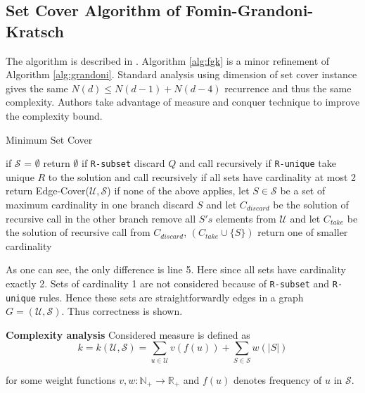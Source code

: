 \subsection{Set Cover Algorithm of Fomin-Grandoni-Kratsch}
The algorithm is described in \cite{10.1145/1552285.1552286}. Algorithm \ref{alg:fgk} is a minor refinement of Algorithm \ref{alg:grandoni}. Standard analysis using dimension of set cover instance gives the same $N(d) \leq N(d -1) + N(d - 4)$ recurrence and thus the same complexity. Authors take advantage of measure and conquer technique to improve the complexity bound.
\begin{algorithm}
\caption{Minimum Set Cover}
\label{alg:fgk}
\begin{algorithmic}[1]
\State if $\mathcal{S}$ = $\emptyset$ return $\emptyset$ 
\State if \texttt{R-subset} discard $Q$ and call recursively
\State if \texttt{R-unique} take unique $R$ to the solution and call recursively
\State if all sets have cardinality at most 2 return Edge-Cover($\mathcal{U}, \mathcal{S}$)
\State if none of the above applies, let $S \in \mathcal{S}$ be a set of maximum cardinality
\State in one branch discard $S$ and let $C_{discard}$ be the solution of recursive call
\State in the other branch remove all $S's$ elements from $\mathcal{U}$ and let $C_{take}$ be the solution of recursive call
\State from $C_{discard}$, $(C_{take} \cup \{S\})$ return one of smaller cardinality
\EndProcedure
\end{algorithmic}
\end{algorithm}
\par As one can see, the only difference is line 5. Here since all sets have cardinality exactly 2. Sets of cardinality 1 are not considered because of \texttt{R-subset} and \texttt{R-unique} rules. Hence these sets are straightforwardly edges in a graph $G = (\mathcal{U}, \mathcal{S})$. Thus correctness is shown.
\par \textbf{Complexity analysis}
Considered measure is defined as
\begin{equation}\label{measure_definition}
    k =  k(\mathcal{U}, \mathcal{S}) = \sum_{u \in \mathcal{U}} v(f(u)) + \sum_{S \in \mathcal{S}} w(|S|)
\end{equation}

for some weight functions $v, w : \mathbb{N_+} \rightarrow \mathbb{R_+}$ and $f(u)$ denotes frequency of $u$ in $\mathcal{S}$.

